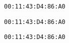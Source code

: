 \documentclass[a4paper]{article}
\begin{document}
\verb|00:11:43:D4:86:A0|

\texttt{00:11:43:D4:86:A0}

\makeatletter\nofrench@punctuation
\verb|00:11:43:D4:86:A0|
\french@punctuation\makeatother
\end{document}
